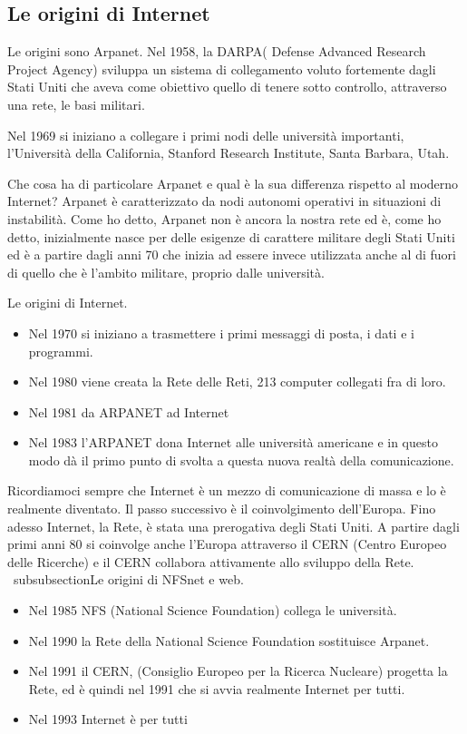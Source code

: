 \subsection{Le origini di Internet}

Le origini sono Arpanet. 
Nel 1958, la DARPA( Defense Advanced Research Project Agency) sviluppa un sistema di collegamento voluto fortemente dagli Stati Uniti che aveva come obiettivo quello di tenere sotto controllo, attraverso una rete, le basi militari. 

Nel 1969 si iniziano a collegare i primi nodi delle università importanti, l'Università della California, Stanford Research Institute, Santa Barbara, Utah. 

Che cosa ha di particolare Arpanet e qual è la sua differenza rispetto al moderno Internet? Arpanet è caratterizzato da nodi autonomi operativi in situazioni di instabilità. Come ho detto, Arpanet non è ancora la nostra rete ed è, come ho detto, inizialmente nasce per delle esigenze di carattere militare degli Stati Uniti ed è a partire dagli anni 70 che inizia ad essere invece utilizzata anche al di fuori di quello che è l'ambito militare, proprio dalle università. 

Le origini di Internet. \par
\begin{itemize}
    \item Nel 1970 si iniziano a trasmettere i primi messaggi di posta, i dati e i programmi.
    \item Nel 1980 viene creata la Rete delle Reti, 213 computer collegati fra di loro.
    \item Nel 1981 da ARPANET ad Internet
    \item Nel 1983 l'ARPANET dona Internet alle università americane e in questo modo dà il primo punto di svolta a questa nuova realtà della comunicazione.
\end{itemize}

Ricordiamoci sempre che Internet è un mezzo di comunicazione di massa e lo è realmente diventato. Il passo successivo è il coinvolgimento dell'Europa. Fino adesso Internet, la Rete, è stata una prerogativa degli Stati Uniti. A partire dagli primi anni 80 si coinvolge anche l'Europa attraverso il CERN (Centro Europeo delle Ricerche) e il CERN collabora attivamente allo sviluppo della Rete.
\
subsubsection{Le origini di NFSnet e web}.

\begin{itemize}
    \item Nel 1985 NFS (National Science Foundation) collega le università.
    \item Nel 1990 la Rete della National Science Foundation sostituisce Arpanet.
    \item Nel 1991 il CERN, (Consiglio Europeo per la Ricerca Nucleare) progetta la Rete, ed è quindi nel 1991 che si avvia realmente Internet per tutti.
    \item Nel 1993 Internet è per tutti
\end{itemize}

